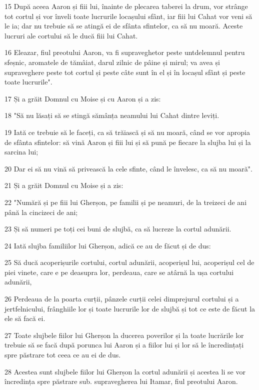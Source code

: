\par 15 După aceea Aaron și fiii lui, înainte de plecarea taberei la drum, vor strânge tot cortul și vor înveli toate lucrurile locașului sfânt, iar fiii lui Cahat vor veni să le ia; dar nu trebuie să se atingă ei de sfânta sfintelor, ca să nu moară. Aceste lucruri ale cortului să le ducă fiii lui Cahat.
\par 16 Eleazar, fiul preotului Aaron, va fi supraveghetor peste untdelemnul pentru sfeșnic, aromatele de tămâiat, darul zilnic de pâine și mirul; va avea și supraveghere peste tot cortul și peste câte sunt în el și în locașul sfânt și peste toate lucrurile".
\par 17 Și a grăit Domnul cu Moise și cu Aaron și a zis:
\par 18 "Să nu lăsați să se stingă sămânța neamului lui Cahat dintre leviți.
\par 19 Iată ce trebuie să le faceți, ca să trăiască și să nu moară, când se vor apropia de sfânta sfintelor: să vină Aaron și fiii lui și să pună pe fiecare la slujba lui și la sarcina lui;
\par 20 Dar ei să nu vină să privească la cele sfinte, când le învelesc, ca să nu moară".
\par 21 Și a grăit Domnul cu Moise și a zis:
\par 22 "Numără și pe fiii lui Gherșon, pe familii și pe neamuri, de la treizeci de ani până la cincizeci de ani;
\par 23 Și să numeri pe toți cei buni de slujbă, ca să lucreze la cortul adunării.
\par 24 Iată slujba familiilor lui Gherșon, adică ce au de făcut și de dus:
\par 25 Să ducă acoperișurile cortului, cortul adunării, acoperișul lui, acoperișul cel de piei vinete, care e pe deasupra lor, perdeaua, care se atârnă la ușa cortului adunării,
\par 26 Perdeaua de la poarta curții, pânzele curții celei dimprejurul cortului și a jertfelnicului, frânghiile lor și toate lucrurile lor de slujbă și tot ce este de făcut la ele să facă ei.
\par 27 Toate slujbele fiilor lui Gherșon la ducerea poverilor și la toate lucrările lor trebuie să se facă după porunca lui Aaron și a fiilor lui și lor să le încredințați spre păstrare tot ceea ce au ei de dus.
\par 28 Acestea sunt slujbele fiilor lui Gherșon la cortul adunării și acestea li se vor încredința spre păstrare sub. supravegherea lui Itamar, fiul preotului Aaron.
